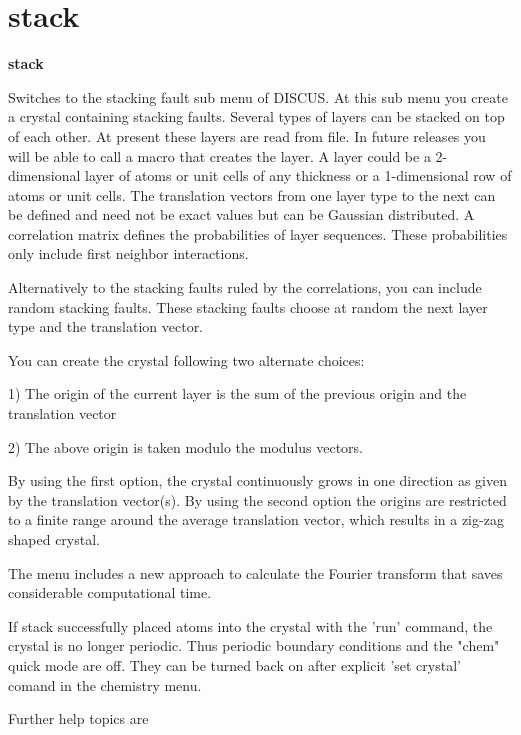 \section{stack}
{\bf stack \par }
\par
\vspace{3pt}
Switches to the stacking fault sub menu of DISCUS. 
At this sub menu you create a crystal containing stacking faults. 
Several types of layers can be stacked on top of each other. At present 
these layers are read from file. In future releases you will be able to 
call a macro that creates the layer. A layer could be a 2-dimensional 
layer of atoms or unit cells of any thickness or a 1-dimensional row 
of atoms or unit cells. 
The translation vectors from one layer type to the next can be defined 
and need not be exact values but can be Gaussian distributed. 
A correlation matrix defines the probabilities of layer sequences. 
These probabilities only include first neighbor interactions. 
\par
Alternatively to the stacking faults ruled by the correlations, you 
can include random stacking faults. These stacking faults choose at 
random the next layer type and the translation vector. 
\par
You can create the crystal following two alternate choices: 
\par
1) The origin of the current layer is the sum of the previous origin 
   and the translation vector 
\par
2) The above origin is taken modulo the modulus vectors. 
\par
By using the first option, the crystal continuously grows in one 
direction as given by the translation vector(s). By using the second 
option the origins are restricted to a finite range around the 
average translation vector, which results in a zig-zag shaped crystal. 
\par
The menu includes a new approach to calculate the Fourier transform that 
saves considerable computational time. 
\par
If stack successfully placed atoms into the crystal with the 
'run' command, the crystal is no longer periodic. Thus periodic 
boundary conditions and the "chem" quick mode are off. They can 
be turned back on after explicit 'set crystal' comand in the 
chemistry menu. 
\par
Further help topics are 
\par
